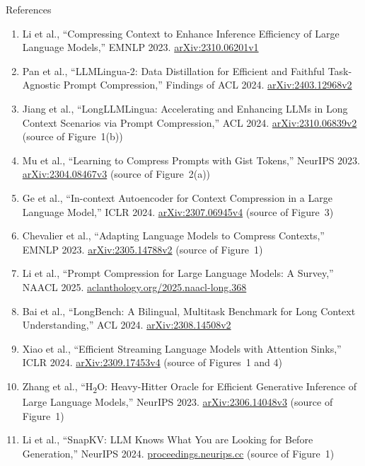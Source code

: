 \begin{frame}[allowframebreaks,t]{References}
\begin{enumerate}
    \item Li et al., ``Compressing Context to Enhance Inference Efficiency of Large Language Models,'' EMNLP 2023. \href{https://arxiv.org/abs/2310.06201v1}{arXiv:2310.06201v1}
    \item Pan et al., ``LLMLingua-2: Data Distillation for Efficient and Faithful Task-Agnostic Prompt Compression,'' Findings of ACL 2024. \href{https://arxiv.org/abs/2403.12968v2}{arXiv:2403.12968v2}
    \item Jiang et al., ``LongLLMLingua: Accelerating and Enhancing LLMs in Long Context Scenarios via Prompt Compression,'' ACL 2024. \href{https://arxiv.org/abs/2310.06839v2}{arXiv:2310.06839v2} (source of Figure~1(b))
    \item Mu et al., ``Learning to Compress Prompts with Gist Tokens,'' NeurIPS 2023. \href{https://arxiv.org/abs/2304.08467v3}{arXiv:2304.08467v3} (source of Figure~2(a))
    \item Ge et al., ``In-context Autoencoder for Context Compression in a Large Language Model,'' ICLR 2024. \href{https://arxiv.org/abs/2307.06945v4}{arXiv:2307.06945v4} (source of Figure~3)
    \item Chevalier et al., ``Adapting Language Models to Compress Contexts,'' EMNLP 2023. \href{https://arxiv.org/abs/2305.14788v2}{arXiv:2305.14788v2} (source of Figure~1)
    \item Li et al., ``Prompt Compression for Large Language Models: A Survey,'' NAACL 2025. \href{https://aclanthology.org/2025.naacl-long.368/}{aclanthology.org/2025.naacl-long.368}
    \item Bai et al., ``LongBench: A Bilingual, Multitask Benchmark for Long Context Understanding,'' ACL 2024. \href{https://arxiv.org/abs/2308.14508v2}{arXiv:2308.14508v2}
    \item Xiao et al., ``Efficient Streaming Language Models with Attention Sinks,'' ICLR 2024. \href{https://arxiv.org/abs/2309.17453v4}{arXiv:2309.17453v4} (source of Figures~1 and 4)
    \item Zhang et al., ``H\textsubscript{2}O: Heavy-Hitter Oracle for Efficient Generative Inference of Large Language Models,'' NeurIPS 2023. \href{https://arxiv.org/abs/2306.14048v3}{arXiv:2306.14048v3} (source of Figure~1)
    \item Li et al., ``SnapKV: LLM Knows What You are Looking for Before Generation,'' NeurIPS 2024. \href{https://proceedings.neurips.cc/paper_files/paper/2024/hash/28ab418242603e0f7323e54185d19bde-Abstract-Conference.html}{proceedings.neurips.cc} (source of Figure~1)

\end{enumerate}
\end{frame}
